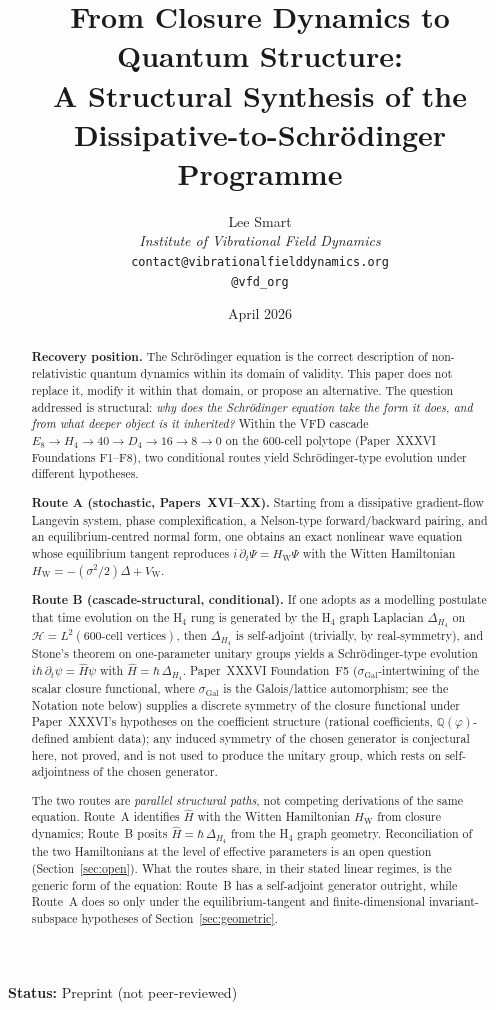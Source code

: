 \documentclass[12pt]{article}
\title{From Closure Dynamics to Quantum Structure:\\[6pt]
\large A Structural Synthesis of the Dissipative-to-Schr\"odinger Programme}
\author{%
  Lee Smart\\[4pt]
  \textit{Institute of Vibrational Field Dynamics}\\[2pt]
  \texttt{contact@vibrationalfielddynamics.org}\\[2pt]
  \texttt{@vfd\_org}%
}
\date{April 2026}
\newcommand{\VW}{V_{\mathrm{W}}}
\newcommand{\HW}{H_{\mathrm{W}}}
\newcommand{\sigmaG}{\sigma_{\mathrm{Gal}}}
\begin{document}
\maketitle

\noindent\textbf{Status:} Preprint (not peer-reviewed)

\begin{abstract}
\textbf{Recovery position.} The Schr\"odinger equation is the correct description of non-relativistic quantum dynamics within its domain of validity. This paper does not replace it, modify it within that domain, or propose an alternative. The question addressed is structural: \emph{why does the Schr\"odinger equation take the form it does, and from what deeper object is it inherited?} Within the VFD cascade $E_8 \to H_4 \to 40 \to D_4 \to 16 \to 8 \to 0$ on the 600-cell polytope (Paper~XXXVI Foundations F1--F8), two conditional routes yield Schr\"odinger-type evolution under different hypotheses.

\textbf{Route A (stochastic, Papers~XVI--XX).} Starting from a dissipative gradient-flow Langevin system, phase complexification, a Nelson-type forward/backward pairing, and an equilibrium-centred normal form, one obtains an exact nonlinear wave equation whose equilibrium tangent reproduces $i\,\partial_t\Psi = \HW\Psi$ with the Witten Hamiltonian $\HW = -(\sigma^2/2)\Delta + \VW$.

\textbf{Route B (cascade-structural, conditional).} If one adopts as a modelling postulate that time evolution on the H${}_4$ rung is generated by the H${}_4$ graph Laplacian $\Delta_{H_4}$ on $\mathcal{H} = L^2(\text{600-cell vertices})$, then $\Delta_{H_4}$ is self-adjoint (trivially, by real-symmetry), and Stone's theorem on one-parameter unitary groups yields a Schr\"odinger-type evolution $i\hbar\,\partial_t\psi = \hat H\psi$ with $\hat H = \hbar\,\Delta_{H_4}$. Paper~XXXVI Foundation~F5 ($\sigmaG$-intertwining of the scalar closure functional, where $\sigmaG$ is the Galois/lattice automorphism; see the Notation note below) supplies a discrete symmetry of the closure functional under Paper~XXXVI's hypotheses on the coefficient structure (rational coefficients, $\mathbb{Q}(\varphi)$-defined ambient data); any induced symmetry of the chosen generator is conjectural here, not proved, and is not used to produce the unitary group, which rests on self-adjointness of the chosen generator.

The two routes are \emph{parallel structural paths}, not competing derivations of the same equation. Route~A identifies $\hat H$ with the Witten Hamiltonian $\HW$ from closure dynamics; Route~B posits $\hat H = \hbar\,\Delta_{H_4}$ from the H${}_4$ graph geometry. Reconciliation of the two Hamiltonians at the level of effective parameters is an open question (Section~\ref{sec:open}). What the routes share, in their stated linear regimes, is the generic form of the equation: Route~B has a self-adjoint generator outright, while Route~A does so only under the equilibrium-tangent and finite-dimensional invariant-subspace hypotheses of Section~\ref{sec:geometric}.


\end{abstract}
\end{document}
